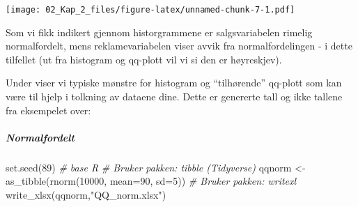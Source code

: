 \documentclass[
]{article}
\newenvironment{Shaded}{\begin{snugshade}}{\end{snugshade}}
\newcommand{\AttributeTok}[1]{\textcolor[rgb]{0.77,0.63,0.00}{#1}}
\newcommand{\CommentTok}[1]{\textcolor[rgb]{0.56,0.35,0.01}{\textit{#1}}}
\newcommand{\DecValTok}[1]{\textcolor[rgb]{0.00,0.00,0.81}{#1}}
\newcommand{\FunctionTok}[1]{\textcolor[rgb]{0.00,0.00,0.00}{#1}}
\newcommand{\NormalTok}[1]{#1}
\newcommand{\OtherTok}[1]{\textcolor[rgb]{0.56,0.35,0.01}{#1}}
\newcommand{\SpecialCharTok}[1]{\textcolor[rgb]{0.00,0.00,0.00}{#1}}
\newcommand{\StringTok}[1]{\textcolor[rgb]{0.31,0.60,0.02}{#1}}
\begin{document}
\begin{Shaded}
\end{Shaded}

\texttt{[image: 02\_Kap\_2\_files/figure-latex/unnamed-chunk-7-1.pdf]}

Som vi fikk indikert gjennom historgrammene er salgsvariabelen rimelig normalfordelt, mens reklamevariabelen viser avvik fra normalfordelingen - i dette tilfellet (ut fra histogram og qq-plott vil vi si den er høyreskjev).

Under viser vi typiske mønstre for histogram og ``tilhørende'' qq-plott som kan være til hjelp i tolkning av dataene dine. Dette er genererte tall og ikke tallene fra eksempelet over:

\hypertarget{normalfordelt}{%
\subparagraph{Normalfordelt}\label{normalfordelt}}

\begin{Shaded}
\begin{Highlighting}[]
\FunctionTok{set.seed}\NormalTok{(}\DecValTok{89}\NormalTok{)}
\CommentTok{\# base R}
\CommentTok{\# Bruker pakken: tibble (Tidyverse)}
\NormalTok{qqnorm }\OtherTok{\textless{}{-}} \FunctionTok{as\_tibble}\NormalTok{(}\FunctionTok{rnorm}\NormalTok{(}\DecValTok{10000}\NormalTok{, }\AttributeTok{mean=}\DecValTok{90}\NormalTok{, }\AttributeTok{sd=}\DecValTok{5}\NormalTok{))}
\CommentTok{\# Bruker pakken: writexl}
\FunctionTok{write\_xlsx}\NormalTok{(qqnorm,}\StringTok{"QQ\_norm.xlsx"}\NormalTok{)}
\end{Highlighting}
\end{Shaded}

\begin{Shaded}
\end{Shaded}
\end{document}
